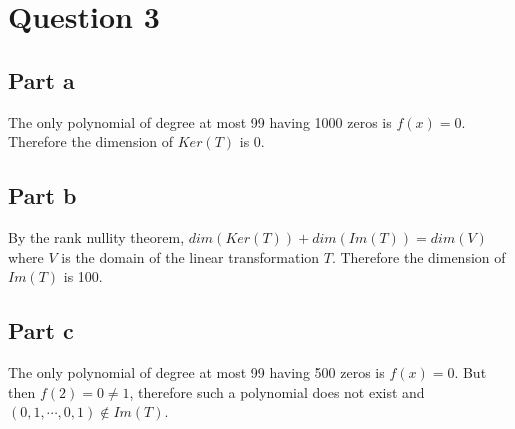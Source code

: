 \section*{Question 3}
\subsection*{Part a}
The only polynomial of degree at most 99 having 1000 zeros is $ f(x) = 0 $. Therefore the dimension of $ Ker(T) $ is 0.
\subsection*{Part b}
By the rank nullity theorem, $ dim(Ker(T)) + dim(Im(T)) = dim(V) $ where $ V $ is the domain of the linear transformation $ T $. Therefore the dimension of $ Im(T) $ is 100.
\subsection*{Part c}
The only polynomial of degree at most 99 having 500 zeros is $ f(x) = 0 $. But then $ f(2) = 0 \ne 1 $, therefore such a polynomial does not exist and $ (0,1,\cdots,0,1) \notin Im(T) $.